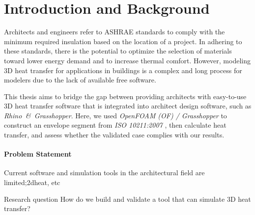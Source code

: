 \chapter{Introduction and Background}
Architects and engineers refer to ASHRAE standards to comply with the minimum required insulation based on the location of a project. 
In adhering to these standards, there is the potential to optimize the selection of materials toward lower energy demand and to increase thermal comfort. 
However, modeling 3D heat transfer for applications in buildings is a complex and long process for modelers due to the lack of available free software. 

This thesis aims to bridge the gap between providing architects with easy-to-use 3D heat transfer software that is integrated into architect design software, such as \textit{Rhino\, \&\, Grasshopper}. Here, we used \textit{OpenFOAM (OF) / Grasshopper} to construct an envelope segment from \textit{ISO 10211:2007}
\cite{ISO}, then calculate heat transfer, and assess whether the validated case complies with our results. 



\subsubsection{Problem Statement}
Current software and simulation tools in the architectural field are limited;2dheat, etc


Research question
How do we build and validate a tool that can simulate 3D heat transfer?



